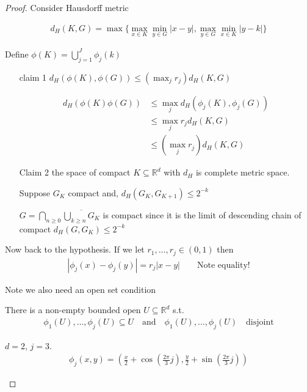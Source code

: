 \begin{proof}
	Consider Hausdorff metric

	\begin{align*}
		d_H (K,G) = \max\{\max_{x\in K} \min_{y \in G} |x - y|, \max_{y\in G} \min_{x \in K} |y - k|\}
	\end{align*} 

	Define $\phi(K) =  \bigcup_{j=1}^{J} \phi_{j}(k)$

	\begin{enumerate}
		\item[claim 1] $d_H(\phi(K), \phi(G)) \leq (\max_{j} r_j ) d_{H}(K,G)$

			\begin{align*}
				d_H (\phi(K) \phi(G)) &\leq \max_{j} d_{H} (\phi_{j}(K), \phi_{j} (G)) \\
									  &\leq \max_{j} r_{j} d_{H}(K,G) \\
									  &\leq (\max_{j} r_{j}) d_{H}(K,G)
			\end{align*} 

		\item[Claim 2] the space of compact $K \subseteq \mathbb{R}^d$ with $d_H$ is complete metric space.

			Suppose $G_{K}$ compact and, $d_{H} (G_{K}, G_{K+1}) \leq 2^{-k}$

		$G = \bigcap_{n \geq 0} \overline{\bigcup_{k \geq n} G_{K}}$
		is compact since it is the limit of descending chain of compact $d_{H}(G, G_{K}) \leq 2^{-k}$

	\end{enumerate}
	Now back to the hypothesis. If we let 
	$r_1, \ldots, r_j \in (0,1)$ then
	\begin{align*}
		|\phi_j (x) - \phi_{j} (y) | = r_{j} |x - y| \qquad \text{Note equality!}
	\end{align*} 

	Note we also need an open set condition

	\begin{remark}
		There is a non-empty bounded open $U \subseteq \mathbb{R}^d$ s.t.
		\begin{align*}
			\phi_{1}(U), \ldots, \phi_{j}(U) \subseteq U \quad \text{and} \quad \phi_{1} (U), \ldots, \phi_{j} (U) \quad \text{disjoint}
		\end{align*} 

	\end{remark}
	
	\begin{example}
		$d = 2$, $j=3$.
		 \begin{align*}
		\phi_{j} (x,y) = \left(\frac{x}{2} + \cos( \frac{2\pi}{3}j), \frac{y}{2} + \sin( \frac{2\pi}{3}j)\right)
		\end{align*} 
	\end{example}
	
\end{proof}



